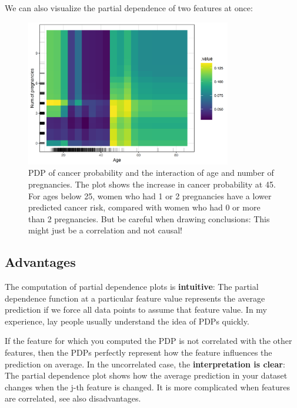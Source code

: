 \documentclass[
  11pt,
]{scrbook}
\begin{document}
We can also visualize the partial dependence of two features at once:

\begin{figure}

{\centering \includegraphics[width=0.8\textwidth]{images/pdp-cervical-2d-1} 

}

\caption{PDP of cancer probability and the interaction of age and number of pregnancies. The plot shows the increase in cancer probability at 45. For ages below 25, women who had 1 or 2 pregnancies have a lower predicted cancer risk, compared with women who had 0 or more than 2 pregnancies. But be careful when drawing conclusions: This might just be a correlation and not causal!}\label{fig:pdp-cervical-2d}
\end{figure}

\hypertarget{advantages-5}{%
\subsection{Advantages}\label{advantages-5}}

The computation of partial dependence plots is \textbf{intuitive}:
The partial dependence function at a particular feature value represents the average prediction if we force all data points to assume that feature value.
In my experience, lay people usually understand the idea of PDPs quickly.

If the feature for which you computed the PDP is not correlated with the other features, then the PDPs perfectly represent how the feature influences the prediction on average.
In the uncorrelated case, the \textbf{interpretation is clear}:
The partial dependence plot shows how the average prediction in your dataset changes when the j-th feature is changed.
It is more complicated when features are correlated, see also disadvantages.
\end{document}
